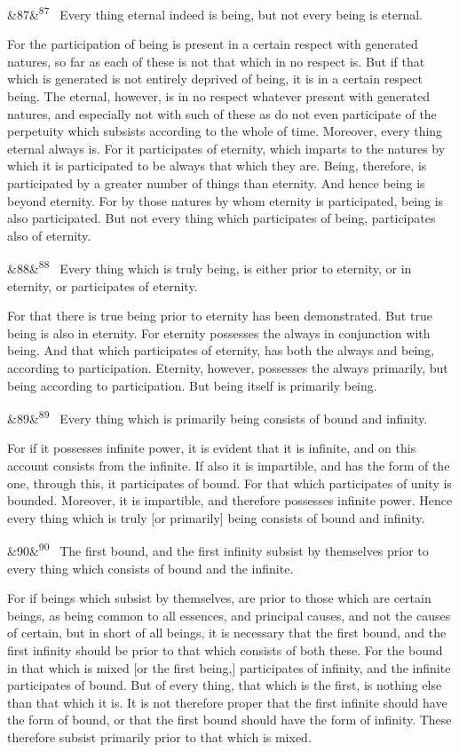 \documentclass[12pt]{article}
\newcommand{\para}[1][]{\par\noindent\ifx&#1&\else\textsuperscript{\footnotesize #1}~\fi}
\begin{document}
\para[87] Every thing eternal indeed is being, but not every being is eternal.

For the participation of being is present in a certain respect with generated natures, so far as each of these is not that which in no respect is. But if that which is generated is not entirely deprived of being, it is in a certain respect being. The eternal, however, is in no respect whatever present with generated natures, and especially not with such of these as do not even participate of the perpetuity which subsists according to the whole of time. Moreover, every thing eternal always is. For it participates of eternity, which imparts to the natures by which it is participated to be always that which they are. Being, therefore, is participated by a greater number of things than eternity. And hence being is beyond eternity. For by those natures by whom eternity is participated, being is also participated. But not every thing which participates of being, participates also of eternity.

\para[88] Every thing which is truly being, is either prior to eternity, or in eternity, or participates of eternity.

For that there is true being prior to eternity has been demonstrated. But true being is also in eternity. For eternity possesses the always in conjunction with being. And that which participates of eternity, has both the always and being, according to participation. Eternity, however, possesses the always primarily, but being according to participation. But being itself is primarily being.

\para[89] Every thing which is primarily being consists of bound and infinity.

For if it possesses infinite power, it is evident that it is infinite, and on this account consists from the infinite. If also it is impartible, and has the form of the one, through this, it participates of bound. For that which participates of unity is bounded. Moreover, it is impartible, and therefore possesses infinite power. Hence every thing which is truly [or primarily] being consists of bound and infinity.

\para[90] The first bound, and the first infinity subsist by themselves prior to every thing which consists of bound and the infinite.

For if beings which subsist by themselves, are prior to those which are certain beings, as being common to all essences, and principal causes, and not the causes of certain, but in short of all beings, it is necessary that the first bound, and the first infinity should be prior to that which consists of both these. For the bound in that which is mixed [or the first being,] participates of infinity, and the infinite participates of bound. But of every thing, that which is the first, is nothing else than that which it is. It is not therefore proper that the first infinite should have the form of bound, or that the first bound should have the form of infinity. These therefore subsist primarily prior to that which is mixed.
\end{document}
